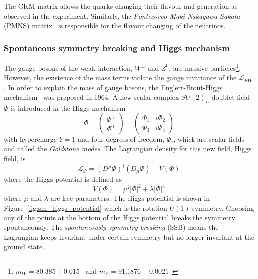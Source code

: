 %
The CKM matrix allows the quarks changing their flavour and generation as observed in the experiment.
Similarly, the \textit{Pontecorvo-Maki-Nakagawa-Sakata} (PMNS) matrix~\cite{PTP.28.870} is responsible for the flavour changing of the neutrinos.


\subsubsection{Spontaneous symmetry breaking and Higgs mechanism}
\label{subsubsec:sm_Higgs_mechanism}
The gauge bosons of the weak interaction, $W^{\pm}$ and $Z^{0}$, are massive particles\footnote{$m_{W}=80.385 \pm 0.015$~{\GeV} and $m_{Z}=91.1876 \pm 0.0021$~{\GeV}}.
However, the existence of the mass terms violate the gauge invariance of the $\mathcal{L}_{EW}$.
In order to explain the mass of gauge bosons, the Englert-Brout-Higgs mechanism~\cite{PhysRev.145.1156,PhysRevLett.13.508,PhysLett.12.132,PhysRevLett.13.321,PhysRevLett.13.585} was proposed in 1964.
A new scalar complex $SU(2)_{L}$ doublet field $\Phi$ is introduced in the Higgs mechanism
%
\begin{equation}
\Phi = \left(\begin{matrix}\Phi^{+}\\\Phi^{0}\end{matrix}\right) = \left(\begin{matrix}\Phi_{1} & i\Phi_{2}\\\Phi_{3} & i\Phi_{4}\end{matrix}\right)
\label{eq:sm_higgs_doublet}
\end{equation}
%
with hypercharge $Y = 1$ and four degrees of freedom, $\Phi_{i}$, which are scalar fields and called the \textit{Goldstone modes}.
The Lagrangian density for this new field, Higgs field, is
%
\begin{equation}
\mathcal{L}_{\Phi} = (D^{\mu}\Phi)^{\dagger}(D_{\mu}\Phi) - V(\Phi)
\label{eq:sm_higgs_lagrangian}
\end{equation}
%
where the Higgs potential is defined as
%
\begin{equation}
V(\Phi) = \mu^{2}|\Phi|^{2} + \lambda|\Phi|^{4}
\label{eq:sm_higgs_potential}
\end{equation}
%
where $\mu$ and $\lambda$ are free parameters.
The Higgs potential is shown in Figure~\ref{fig:sm_higgs_potential} which is the rotation $U(1)$ symmetry.
Choosing any of the points at the bottom of the Higgs potential breaks the symmetry spontaneously.
The \textit{spontaneously symmetry breaking} (SSB) means the Lagrangian keeps invariant under certain symmetry but no longer invariant at the ground state.

